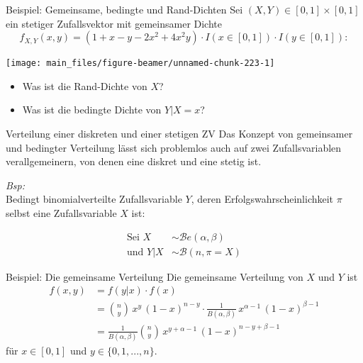 \documentclass[
  10pt,
  ignorenonframetext,
]{beamer}
\providecommand{\tightlist}{%
  \setlength{\itemsep}{0pt}\setlength{\parskip}{0pt}}
\begin{document}
\begin{frame}{Beispiel: Gemeinsame, bedingte und Rand-Dichten}
\label{beispiel-gemeinsame-bedingte-und-rand-dichten}
Sei \((X, Y) \in [0, 1] \times [0, 1]\) ein stetiger Zufallsvektor mit
gemeinsamer Dichte
\[f_{X,Y}(x, y) = (1 + x - y - 2 x^2 + 4x^2 y)\cdot  I(x \in [0, 1]) \cdot I(y \in [0, 1]):\]

\scriptsize

\begin{center}\texttt{[image: main\_files/figure-beamer/unnamed-chunk-223-1]} \end{center}

\normalsize

\begin{itemize}
\tightlist
\item
  Was ist die Rand-Dichte von \(X\)?
\item
  Was ist die bedingte Dichte von \(Y|X = x\)?
\end{itemize}
\end{frame}

\begin{frame}{Verteilung einer diskreten und einer stetigen ZV}
\label{verteilung-einer-diskreten-und-einer-stetigen-zv}
Das Konzept von gemeinsamer und bedingter Verteilung lässt sich
problemlos auch auf zwei Zufallsvariablen verallgemeinern, von denen
eine diskret und eine stetig ist.

\emph{Bsp:}\\
Bedingt binomialverteilte Zufallsvariable \(Y\), deren
Erfolgswahrscheinlichkeit \(\pi\) selbst eine Zufallsvariable \(X\) ist:

\begin{align*}
\text{Sei } X &\sim {\mathcal Be}(\alpha, \beta)\\
\text{und } Y|X &\sim {\mathcal B}(n, \pi = X)
\end{align*}
\end{frame}

\begin{frame}{Beispiel: Die gemeinsame Verteilung}
\label{beispiel-die-gemeinsame-verteilung}
Die gemeinsame Verteilung von \(X\) und \(Y\) ist \begin{align*}
f(x,y) & =  f(y|x) \cdot f(x)\\
      & =  {n \choose y} \, x^y \, (1 - x)^{n - y} \cdot \frac{1}{B(\alpha, \beta)} \, x^{\alpha - 1} \, (1 - x)^{\beta - 1}\\
      & =  \frac{1}{B(\alpha, \beta)}{n \choose y} \, x^{y + \alpha -1} \, (1 - x)^{n - y + \beta -1}
\end{align*} für \(x \in [0,1]\) und \(y \in \{0, 1, ..., n \}\).
\end{frame}
\end{document}
